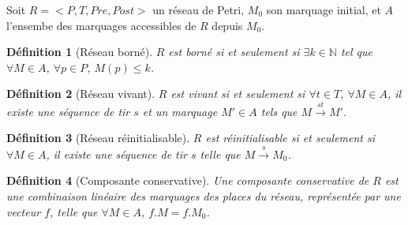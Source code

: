 \documentclass[a4paper]{article}
\newtheorem{definition}{Définition}
\begin{document}
Soit $R = <P, T, Pre, Post>$ un réseau de Petri, $M_0$ son marquage initial, et $A$ l'ensembe des marquages accessibles de $R$ depuis $M_0$.

\begin{definition}[Réseau borné]
$R$ est borné si et seulement si $\exists k \in \mathbb{N}$ tel que $\forall M \in A$, $\forall p \in P$, $M(p) \leq k$.
\end{definition}

\begin{definition}[Réseau vivant]
$R$ est vivant si et seulement si $\forall t \in T$, $\forall M \in A$, il existe une séquence de tir $s$ et un marquage $M' \in A$ tels que
$M \overset{st}{\longrightarrow} M'$.
\end{definition}

\begin{definition}[Réseau réinitialisable]
$R$ est réinitialisable si et seulement si $\forall M \in A$, il existe une séquence de tir $s$ telle que 
$M \overset{s}{\longrightarrow} M_0$.
\end{definition}

\begin{definition}[Composante conservative]
Une composante conservative de $R$ est une combinaison linéaire des marquages des places du réseau, représentée par une vecteur $f$, 
telle que $\forall M \in A$, $f.M = f.M_0$.
\end{definition}


\end{document}
